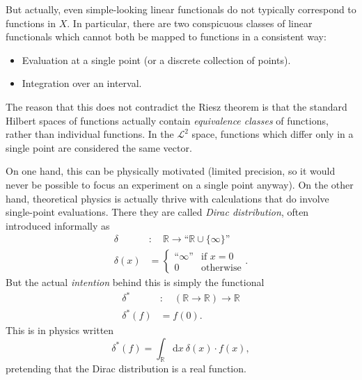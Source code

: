 \documentclass[sigplan,review,anonymous]{acmart}\settopmatter{printfolios=true,printccs=false,printacmref=false}
\begin{document}
But actually, even simple-looking linear functionals do not typically correspond to functions in $X$. In particular, there are two conspicuous classes of linear functionals which cannot both be mapped to functions in a consistent way:
\begin{itemize}
 \item Evaluation at a single point (or a discrete collection of points). %
 \item Integration over an interval.  %
\end{itemize}
The reason that this does not contradict the Riesz theorem is that the standard Hilbert spaces of functions actually contain \emph{equivalence classes} of functions, rather than individual functions. In the $\mathcal{L}^2$ space, functions which differ only in a single point are considered the same vector.

On one hand, this can be physically motivated (limited precision, so it would never be possible to focus an experiment on a single point anyway).
On the other hand, theoretical physics is actually thrive with calculations that do involve single-point evaluations. There they are called \emph{Dirac distribution}, often introduced informally as
\begin{align*}
  \delta &:\quad \mathbb{R} \to “\mathbb{R}\cup\{\infty\}”
 \\
  \delta(x) &= \begin{cases} “\infty” & \text{if }x=0
                          \\ 0        & \text{otherwise} \end{cases}.
\end{align*}
But the actual \emph{intention} behind this is simply the functional
\begin{align*}
  \delta^\ast &:\quad (\mathbb{R} \to \mathbb{R}) \to \mathbb{R}
 \\
  \delta^\ast(f) &= f(0).
\end{align*}
This is in physics written
\[
  \delta^\ast(f) = \int_\mathbb{R}\!\mathrm{d}x\: \delta(x)\cdot f(x),
\]
pretending that the Dirac distribution is a real function.
\end{document}

